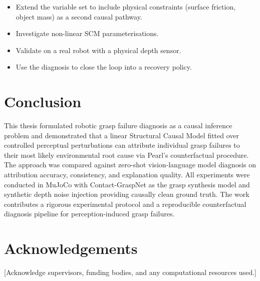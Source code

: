\documentclass[journal]{IEEEtran}
\begin{document}
\begin{itemize}
  \item Extend the variable set to include physical constraints
        (surface friction, object mass) as a second causal pathway.
  \item Investigate non-linear SCM parameterisations.
  \item Validate on a real robot with a physical depth sensor.
  \item Use the diagnosis to close the loop into a recovery policy.
\end{itemize}

\section{Conclusion}
\label{sec:conclusion}

This thesis formulated robotic grasp failure diagnosis as a causal
inference problem and demonstrated that a linear Structural Causal
Model fitted over controlled perceptual perturbations can attribute
individual grasp failures to their most likely environmental root
cause via Pearl's counterfactual procedure.  The approach was
compared against zero-shot vision-language model diagnosis on
attribution accuracy, consistency, and explanation quality.  All
experiments were conducted in MuJoCo with Contact-GraspNet as the
grasp synthesis model and synthetic depth noise injection providing
causally clean ground truth.  The work contributes a rigorous
experimental protocol and a reproducible counterfactual diagnosis
pipeline for perception-induced grasp failures.

\section*{Acknowledgements}

[Acknowledge supervisors, funding bodies, and any computational
resources used.]


\end{document}
